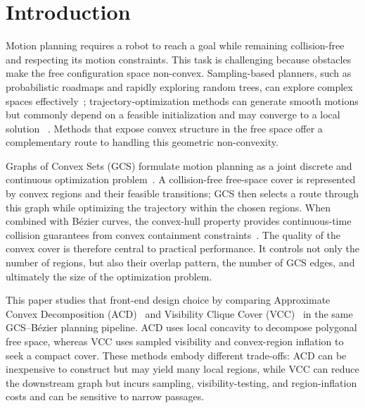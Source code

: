 ﻿\documentclass[runningheads]{llncs}
\begin{document}
%
%
\section{Introduction}
Motion planning requires a robot to reach a goal while remaining collision-free
and respecting its motion constraints. This task is challenging because obstacles
make the free configuration space non-convex. Sampling-based planners, such as
probabilistic roadmaps and rapidly exploring random trees, can explore complex
spaces effectively~\cite{KavrakiEtAl1996,LaValle1998}; trajectory-optimization
methods can generate smooth motions but commonly depend on a feasible
initialization and may converge to a local solution
~\cite{Zucker2013_CHOMP,Schulman2014_TrajOpt}. Methods that expose convex
structure in the free space offer a complementary route to handling this
geometric non-convexity.

Graphs of Convex Sets (GCS) formulate motion planning as a joint discrete and
continuous optimization problem~\cite{MarcucciEtAl2023GCS}. A collision-free
free-space cover is represented by convex regions and their feasible
transitions; GCS then selects a route through this graph while optimizing the
trajectory within the chosen regions. When combined with B\'ezier curves, the
convex-hull property provides continuous-time collision guarantees from convex
containment constraints~\cite{MarcucciEtAl2023MotionPlanning}. The quality of
the convex cover is therefore central to practical performance. It controls not
only the number of regions, but also their overlap pattern, the number of GCS
edges, and ultimately the size of the optimization problem.

This paper studies that front-end design choice by comparing Approximate Convex
Decomposition (ACD)~\cite{LienAmato2006} and Visibility Clique Cover
(VCC)~\cite{DeitsTedrake2023VCC} in the same GCS--B\'ezier planning pipeline.
ACD uses local concavity to decompose polygonal free space, whereas VCC uses
sampled visibility and convex-region inflation to seek a compact cover. These
methods embody different trade-offs: ACD can be inexpensive to construct but may
yield many local regions, while VCC can reduce the downstream graph but incurs
sampling, visibility-testing, and region-inflation costs and can be sensitive to
narrow passages.
\end{document}
